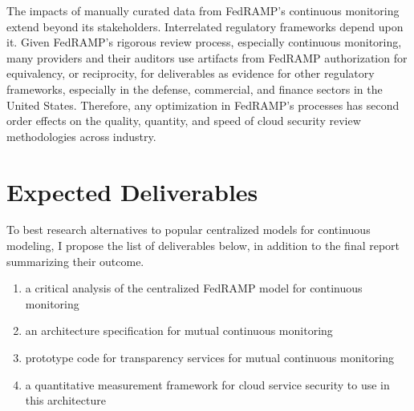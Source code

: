 \documentclass{jdf}
\begin{document}
The impacts of manually curated data from FedRAMP's continuous monitoring extend beyond its stakeholders. Interrelated regulatory frameworks depend upon it. Given FedRAMP's rigorous review process, especially continuous monitoring, many providers and their auditors use artifacts from FedRAMP authorization for equivalency, or reciprocity, for deliverables as evidence for other regulatory frameworks, especially in the defense, commercial, and finance sectors in the United States. Therefore, any optimization in FedRAMP's processes has second order effects on the quality, quantity, and speed of cloud security review methodologies across industry.

\section{Expected Deliverables}

To best research alternatives to popular centralized models for continuous modeling, I propose the list of deliverables below, in addition to the final report summarizing their outcome. 

\begin{enumerate}
    \item a critical analysis of the centralized FedRAMP model for continuous monitoring
    \item an architecture specification for mutual continuous monitoring
    \item prototype code for transparency services for mutual continuous monitoring
    \item a quantitative measurement framework for cloud service security to use in this architecture
\end{enumerate}



\end{document}
